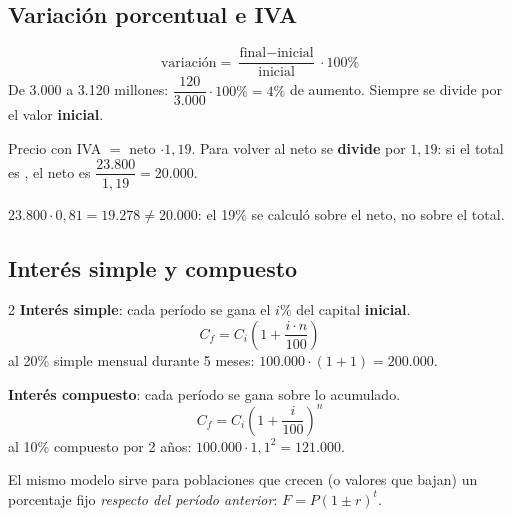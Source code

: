 \subsection{Variación porcentual e IVA}
\[ \text{variación} = \frac{\text{final} - \text{inicial}}{\text{inicial}}\cdot 100\% \]
De 3.000 a 3.120 millones: $\dfrac{120}{3.000}\cdot 100\% = 4\%$ de aumento. Siempre se divide por el valor \textbf{inicial}.
\begin{clave}[IVA (19\%)] Precio con IVA $=$ neto $\cdot 1{,}19$. Para volver al neto se \textbf{divide} por $1{,}19$: si el total es , el neto es $\dfrac{23.800}{1{,}19} = 20.000$.\end{clave}
\begin{ojo}[No se resta el 19\%] $23.800\cdot 0{,}81 = 19.278 \neq 20.000$: el 19\% se calculó sobre el neto, no sobre el total.\end{ojo}

\subsection{Interés simple y compuesto}
\begin{multicols}{2}
\textbf{Interés simple}: cada período se gana el $i\%$ del capital \textbf{inicial}.
\[ C_f = C_i\left(1 + \frac{i\cdot n}{100}\right) \]
 al 20\% simple mensual durante 5 meses: $100.000\cdot(1 + 1) = 200.000$.

\columnbreak
\textbf{Interés compuesto}: cada período se gana sobre lo acumulado.
\[ C_f = C_i\left(1 + \frac{i}{100}\right)^n \]
 al 10\% compuesto por 2 años: $100.000\cdot 1{,}1^2 = 121.000$.
\end{multicols}
El mismo modelo sirve para poblaciones que crecen (o valores que bajan) un porcentaje fijo \emph{respecto del período anterior}: $F = P(1 \pm r)^t$.
\begin{center}
\end{center}

